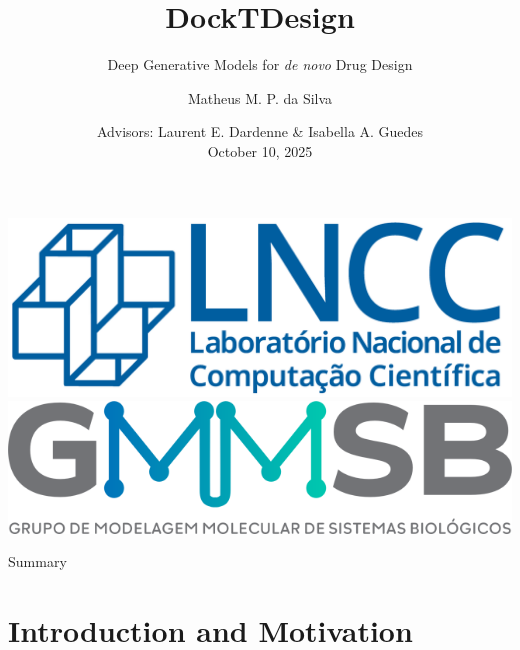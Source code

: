 \documentclass[aspectratio=169,xcolor=dvipsnames]{beamer}
\title{DockTDesign}
\subtitle{Deep Generative Models for \textit{de novo} Drug Design}
\author{Matheus M. P. da Silva}
\institute
{
    PhD Defense in Computational Modeling \\
    National Laboratory for Scientific Computing (LNCC/MCTI) \\
}
\date{Advisors: Laurent E. Dardenne \& Isabella A. Guedes \\ \vspace{0.5em} October 10, 2025}
\begin{document}
\begin{frame}
    \begin{center}
        \includegraphics[height=1.cm]{imgs/logos/lncc-logo.png}
        \hspace{1.cm}
        \includegraphics[height=1.cm]{imgs/logos/gmmsb-logo.png}
    \end{center}
    \vspace{-5em}

    \titlepage
\end{frame}

\begin{frame}{Summary}

    \tableofcontents
\end{frame}





\section{Introduction and Motivation}
\end{document}
